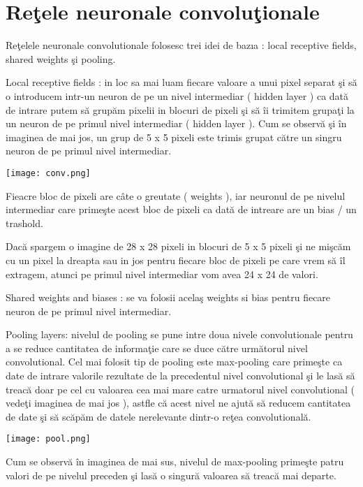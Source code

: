 \chapter{Re\c{t}ele neuronale convolu\c{t}ionale}

Re\c{t}elele neuronale convolutionale folosesc trei idei de baz\i{a} : local receptive fields, shared weights \c{s}i pooling.

\par

Local receptive fields : in loc sa mai luam fiecare valoare a unui pixel separat \c{s}i s\u{a} o introducem intr-un neuron de pe un nivel intermediar ( hidden layer ) ca dat\u{a} de intrare putem s\u{a} grup\u{a}m pixelii in blocuri de pixeli \c{s}i s\u{a} \^{i}i trimitem grupa\c{t}i la un neuron de pe primul nivel intermediar ( hidden layer ).   Cum se observ\u{a} \c{s}i \^{i}n imaginea de mai jos, un grup de 5 x 5 pixeli este trimis grupat c\u{a}tre un singru neuron de pe primul nivel intermediar.

\texttt{[image: conv.png]}

Fieacre bloc de pixeli are c\^{a}te o greutate ( weights ), iar neuronul de pe nivelul intermediar care prime\c{s}te acest bloc de pixeli ca dat\u{a} de intreare are un bias / un trashold.

\par

Dac\u{a} spargem o imagine de 28 x 28 pixeli in blocuri de 5 x 5 pixeli \c{s}i ne mi\c{s}c\u{a}m cu un pixel la dreapta sau in jos pentru fiecare bloc de pixeli pe care vrem s\u{a} \^{i}l extragem, atunci pe primul nivel intermediar vom avea 24 x 24 de valori.

\par

Shared weights and biases : se va folosii acela\c{s} weights si bias pentru fiecare neuron de pe primul nivel intermediar.

\par

Pooling layers: nivelul de pooling se pune intre doua nivele convolutionale pentru a se reduce cantitatea de informa\c{t}ie care se duce c\u{a}tre urm\u{a}torul nivel convolutional. Cel mai folosit tip de pooling este max-pooling care prime\c{s}te ca date de intrare valorile rezultate de la precedentul nivel convolutional \c{s}i le las\u{a} s\u{a} treac\u{a} doar pe cel cu valoarea cea mai mare catre urmatorul nivel convolutional ( vede\c{t}i imaginea de mai jos ), astfle c\u{a} acest nivel ne ajut\u{a} s\u{a} reducem cantitatea de date \c{s}i s\u{a} sc\u{a}p\u{a}m de datele nerelevante dintr-o re\c{t}ea convolutional\u{a}.

\texttt{[image: pool.png]}

Cum se observ\u{a} \^{i}n imaginea de mai sus, nivelul de max-pooling prime\c{s}te patru valori de pe nivelul preceden \c{s}i las\u{a} o singur\u{a} valoarea s\u{a} treac\u{a} mai departe.
